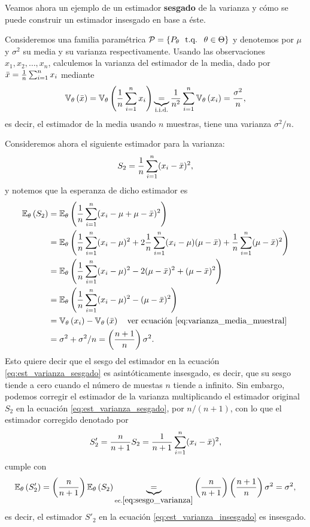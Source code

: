 Veamos ahora un ejemplo de un estimador \textbf{sesgado} de la varianza y cómo se puede construir un estimador insesgado en base a éste. 

\begin{example}[Pythagoras]
Consideremos una familia paramétrica $\mathcal{P} = \{P_\theta\ {\text{ t.q. }}\ \theta\in\Theta\}$ y denotemos por $\mu$ y $\sigma^2$ su media y su varianza respectivamente. Usando las observaciones $x_1,x_2,\ldots,x_n$, calculemos la varianza del estimador de la media, dado por ${ \bar{x}} = \frac{1}{n}\sum_{i=1}^n x_i$ mediante
\begin{equation}
	\label{eq:varianza_media_muestral}
 	\mathbb{V}_\theta \left({ \bar{x}}\right) = \mathbb{V}_\theta \left(\frac{1}{n}	\sum_{i=1}^n x_i\right)  \underbrace{=}_{\text{i.i.d.}}  \frac{1}{n^2}	\sum_{i=1}^n\mathbb{V}_\theta \left( x_i\right) =\frac{\sigma^2}{n},
 \end{equation} 
 es decir, el estimador de la media usando $n$ muestras, tiene una varianza $\sigma^2/n$.

 Consideremos ahora el siguiente estimador para la varianza: 
\begin{equation}
	\label{eq:est_varianza_sesgado}
	S_2 = \frac{1}{n}\sum_{i=1}^n (x_i-{ \bar{x}})^2,
\end{equation}
y notemos que la esperanza de dicho estimador es
\begin{align}
	\label{eq:sesgo_varianza}
	\mathbb{E}_\theta \left(S_2 \right) &= \mathbb{E}_\theta \left(\frac{1}{n}\sum_{i=1}^n (x_i-\mu+\mu-{ \bar{x}})^2\right)\nonumber\\
				&= \mathbb{E}_\theta \left( \frac{1}{n}\sum_{i=1}^n(x_i-\mu)^2 + 2\frac{1}{n}\sum_{i=1}^n(x_i-\mu)(\mu-{ \bar{x}}) + \frac{1}{n}\sum_{i=1}^n(\mu-{ \bar{x}})^2\right)\nonumber\\
				&= \mathbb{E}_\theta \left( \frac{1}{n}\sum_{i=1}^n(x_i-\mu)^2 - 2(\mu-{ \bar{x}})^2 + (\mu-{ \bar{x}})^2\right)\nonumber\\
				&= \mathbb{E}_\theta \left( \frac{1}{n}\sum_{i=1}^n(x_i-\mu)^2 - (\mu-{ \bar{x}})^2\right)\nonumber\\
				&= \mathbb{V}_\theta \left(x_i\right) - \mathbb{V}_\theta \left({ \bar{x}}\right)\quad\text{ver ecuación \eqref{eq:varianza_media_muestral}}\nonumber\\
				&= 	\sigma^2 + \sigma^2/n = \left(\frac{n+1}{n}\right)\sigma^2.
\end{align}
Esto quiere decir que el sesgo del estimador en la ecuación \eqref{eq:est_varianza_sesgado} es asintóticamente insesgado, es decir, que su sesgo tiende a cero cuando el número de muestas $n$ tiende a infinito. Sin embargo, podemos corregir el estimador de la varianza multiplicando el estimador original $S_2$ en la ecuación \eqref{eq:est_varianza_sesgado}, por $n/(n+1)$, con lo que el estimador corregido denotado por 
\begin{equation}
	\label{eq:est_varianza_insesgado}
	S'_2 = \frac{n}{n+1}S_2 =  \frac{1}{n+1}\sum_{i=1}^n (x_i-{ \bar{x}})^2,
\end{equation}
cumple con
\begin{equation}
	\mathbb{E}_\theta \left(S'_2 \right) =  \left(\frac{n}{n+1}\right)\mathbb{E}_\theta \left(S_2\right) \underbrace{=}_{\text{ec.}\eqref{eq:sesgo_varianza}} \left(\frac{n}{n+1}\right) \left(\frac{n+1}{n}\right)\sigma^2 = \sigma^2,
\end{equation}
es decir, el estimador $S'_2$ en la ecuación \eqref{eq:est_varianza_insesgado} es insesgado.
\end{example}






